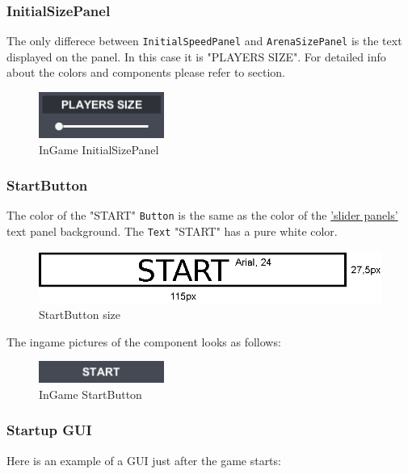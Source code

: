 \subsubsection{InitialSizePanel}\label{gui-initialsizepanel}
\noindent The only differece between \verb+InitialSpeedPanel+ and \verb+ArenaSizePanel+ is the text displayed on the panel. In this case it is "PLAYERS SIZE". For detailed info about the colors and components please refer to  section.

\begin{figure}[h!] 
	\centering
	\includegraphics[scale=1, frame]{gui-imgs/initialsizepanel}
	\caption{InGame InitialSizePanel}
\end{figure}

\subsubsection{StartButton}\label{gui-startbutton}
\noindent The color of the "START" \verb+Button+ is the same as the color of the \hyperref[gui-arenasizepanel]{'slider panels'} text panel background. The \verb+Text+ "START" has a pure white color.
\newpage

\begin{figure}[h!] 
	\centering
	\includegraphics[scale=1]{gui-imgs/startbutton-size}
	\caption{StartButton size}
\end{figure}

\noindent The ingame pictures of the component looks as follows:

\begin{figure}[h!]
	\centering
	\includegraphics[scale=1, frame]{gui-imgs/startbutton}
	\caption{InGame StartButton}
\end{figure}

\subsubsection{Startup GUI}
\noindent Here is an example of a GUI just after the game starts:

